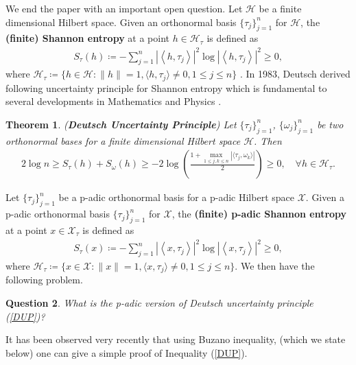 \documentclass{amsart}
\newtheorem{theorem}{Theorem}[section]
\newtheorem{question}[theorem]{Question}
\begin{document}
We end the paper with an important open question. Let $\mathcal{H}$ be a finite dimensional Hilbert space. Given an orthonormal basis  $\{\tau_j\}_{j=1}^n$ for $\mathcal{H}$, the \textbf{ (finite) Shannon entropy}  at a point $h \in \mathcal{H}_\tau$ is defined as 
\begin{align*}
	S_\tau (h)\coloneqq - \sum_{j=1}^{n} \left|\left \langle h, \tau_j\right\rangle \right|^2\log \left|\left \langle h, \tau_j\right\rangle \right|^2\geq 0,
\end{align*}
where $\mathcal{H}_\tau\coloneqq \{h \in \mathcal{H}: \|h\|=1, \langle h , \tau_j \rangle \neq 0, 1\leq j \leq n\}$ \cite{DEUTSCH}. In 1983, Deutsch derived following uncertainty principle for Shannon entropy which is fundamental to several developments in Mathematics and   Physics \cite{DEUTSCH}.
\begin{theorem}\cite{DEUTSCH} (\textbf{Deutsch Uncertainty Principle})  \label{DU}
	Let $\{\tau_j\}_{j=1}^n$,  $\{\omega_j\}_{j=1}^n$ be two orthonormal bases for a  finite dimensional Hilbert space $\mathcal{H}$. Then 
	\begin{align}\label{DUP}
		2 \log n \geq S_\tau (h)+S_\omega (h)\geq -2 \log \left(\frac{1+\displaystyle \max_{1\leq j, k \leq n}|\langle\tau_j , \omega_k\rangle|}{2}\right)	\geq 0, \quad \forall h \in \mathcal{H}_\tau.
	\end{align}
\end{theorem}
Let $\{\tau_j\}_{j=1}^n$ be a p-adic orthonormal basis for a p-adic Hilbert space $\mathcal{X}$. Given a p-adic  orthonormal basis  $\{\tau_j\}_{j=1}^n$ for $\mathcal{X}$, the \textbf{ (finite) p-adic Shannon entropy}  at a point $x \in \mathcal{X}_\tau$ is defined as 
\begin{align*}
	S_\tau (x)\coloneqq - \sum_{j=1}^{n} \left|\left \langle x, \tau_j\right\rangle \right|^2\log \left|\left \langle x, \tau_j\right\rangle \right|^2\geq 0,
\end{align*}
where $\mathcal{H}_\tau\coloneqq \{x \in \mathcal{X}: \|x\|=1, \langle x , \tau_j \rangle \neq 0, 1\leq j \leq n\}$. We then have the following problem.
\begin{question}
	What is the p-adic version of Deutsch uncertainty principle (\ref{DUP})?
\end{question}
It has been observed very recently  \cite{KRISHNA2} that using Buzano inequality, (which we state below) one can give a simple proof of Inequality (\ref{DUP}).
\end{document}
